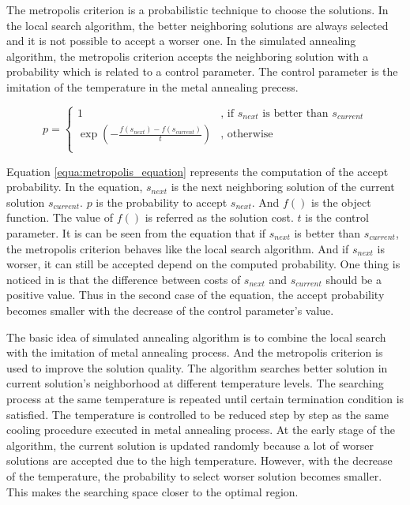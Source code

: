 		The metropolis criterion is a probabilistic technique to choose the solutions.
		In the local search algorithm, the better neighboring solutions are always selected
		and it is not possible to accept a worser one. In the simulated annealing
		algorithm, the metropolis criterion accepts the neighboring solution with a 
		probability which is related to a control parameter. The control parameter
		is the imitation of the temperature in the metal annealing precess.
	
		\begin{equation}
		\label{equa:metropolis_equation}
			p=
				\begin{cases}
					1 & \text{, if } s_{next} \text{ is better than } s_{current}\\
					\exp{\left( -\frac{f(s_{next})-f(s_{current})}{t} \right)} & \text{, otherwise}\\
				\end{cases}
		\end{equation}
		
		Equation \ref{equa:metropolis_equation} represents the computation of the accept
		probability. In the equation, $s_{next}$ is the next neighboring solution of the
		current solution $s_{current}$. $p$ is the probability to accept $s_{next}$.
		And $f()$ is the object function. The value of $f()$ is referred as the
		solution cost. $t$ is the control parameter. It is can be seen from the equation
		that if $s_{next}$ is better than $s_{current}$, the metropolis criterion behaves
		like the local search algorithm. And if $s_{next}$ is worser, it can still be accepted
		depend on the computed probability. One thing is noticed in \cite{10.2307/1690046}
		is that the difference between costs of $s_{next}$ and $s_{current}$ should be a
		positive value. Thus in the second case of the equation, the accept probability
		becomes smaller with the decrease of the control parameter's value.
		
		The basic idea of simulated annealing algorithm is to combine the local search
		with the imitation of metal annealing process. And the metropolis criterion is
		used to improve the solution quality.
		The algorithm searches better solution in current solution's neighborhood at 
		different temperature levels.
		The searching process at the same temperature is repeated until certain termination
		condition is satisfied. The temperature is controlled to be reduced step by step
		as the same cooling procedure executed in metal annealing process. At the early
		stage of the algorithm, the current solution is updated randomly because a lot of
		worser solutions are accepted due to the high temperature. However, with
		the decrease of the temperature, the probability to select worser solution becomes
		smaller. This makes the searching space closer to the optimal region.
		
